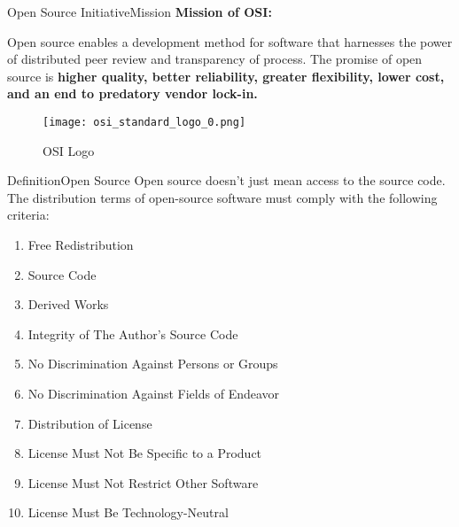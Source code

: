 \documentclass{beamer}
\begin{document}
    \begin{frame}{Open Source Initiative}{Mission}
        \textbf{Mission of OSI:}

        Open source enables a development method for software that harnesses the power of distributed peer review and transparency of process.
        The promise of open source is \textbf{higher quality, better reliability, greater flexibility, lower cost, and an end to predatory vendor lock-in.}\cite{OSIWEBSITE:3}
        \begin{figure}
            \centering
            \texttt{[image: osi\_standard\_logo\_0.png]}
            \caption{OSI Logo\cite{OSIWEBSITE:4}}
        \end{figure}
    \end{frame}
    \begin{frame}{Definition}{Open Source}
        Open source doesn't just mean access to the source code. The distribution terms of open-source software must comply with the following criteria\cite{OSIWEBSITE:1}:
        \begin{enumerate}
            \item Free Redistribution
            \item Source Code
            \item Derived Works
            \item Integrity of The Author's Source Code
            \item No Discrimination Against Persons or Groups
            \item No Discrimination Against Fields of Endeavor
            \item Distribution of License
            \item License Must Not Be Specific to a Product
            \item License Must Not Restrict Other Software
            \item License Must Be Technology-Neutral
        \end{enumerate}
    \end{frame}
\end{document}
